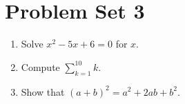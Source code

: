 \documentclass{article}
\begin{document}
\section*{Problem Set 3}

\begin{enumerate}
\item Solve $x^2 - 5x + 6 = 0$ for $x$.
\item Compute $\sum_{k=1}^{10} k$.
\item Show that $(a+b)^2 = a^2 + 2ab + b^2$.
\end{enumerate}
\end{document}
